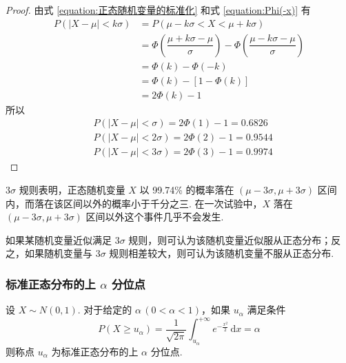 \begin{proof}
    由式 \eqref{equation:正态随机变量的标准化} 和式 \eqref{equation:Phi(-x)} 有
    $$
    \begin{aligned}
        P(|X-\mu| < k \sigma) &= P(\mu - k \sigma < X < \mu + k \sigma) \\
        &= \varPhi(\dfrac{\mu + k \sigma - \mu}{\sigma}) - \varPhi(\dfrac{\mu - k \sigma - \mu}{\sigma}) \\
        &= \varPhi(k) - \varPhi(-k) \\
        &= \varPhi(k) - [1 - \varPhi(k)] \\
        &= 2\varPhi(k) - 1
    \end{aligned}
    $$
    所以
    $$
    \begin{aligned}
        & P(|X - \mu| < \sigma) = 2\varPhi(1) - 1 = 0.6826 \\
        & P(|X - \mu| < 2\sigma) = 2\varPhi(2) - 1 = 0.9544 \\
        & P(|X - \mu| < 3\sigma) = 2\varPhi(3) - 1 = 0.9974
    \end{aligned}
    $$
\end{proof}

$3\sigma$ 规则表明，正态随机变量 $X$ 以 99.74\% 的概率落在 $(\mu - 3\sigma, \mu + 3\sigma)$ 区间内，而落在该区间以外的概率小于千分之三. 在一次试验中，$X$ 落在 $(\mu - 3\sigma, \mu + 3\sigma)$ 区间以外这个事件几乎不会发生.

如果某随机变量近似满足 $3\sigma$ 规则，则可认为该随机变量近似服从正态分布；反之，如果随机变量与 $3\sigma$ 规则相差较大，则可认为该随机变量不服从正态分布.

\subsubsection{标准正态分布的上 \texorpdfstring{$\alpha$}{} 分位点}

\begin{definition}
    \indent 设 $X \sim N(0,1)$. 对于给定的 $\alpha \, (0 < \alpha < 1)$，如果 $u_{\alpha}$ 满足条件
    $$
    P(X \geqslant u_{\alpha}) = \dfrac{1}{\sqrt{2\pi}} \int_{u_{\alpha}}^{+\infty} e^{-\frac{x^2}{2}} \, \text{d}x = \alpha
    $$
    则称点 $u_{\alpha}$ 为标准正态分布的{\heiti 上} $\alpha$ {\heiti 分位点}.
\end{definition}

